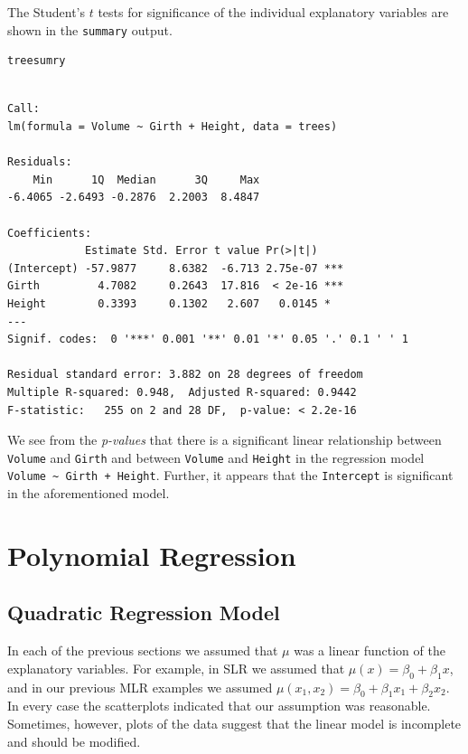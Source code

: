 \documentclass[captions=tableheading]{scrbook}
\begin{document}
The Student's \(t\) tests for significance of the individual explanatory variables are shown in the \texttt{summary} output.


\begin{verbatim}
treesumry
\end{verbatim}


\begin{verbatim}

Call:
lm(formula = Volume ~ Girth + Height, data = trees)

Residuals:
    Min      1Q  Median      3Q     Max 
-6.4065 -2.6493 -0.2876  2.2003  8.4847 

Coefficients:
            Estimate Std. Error t value Pr(>|t|)    
(Intercept) -57.9877     8.6382  -6.713 2.75e-07 ***
Girth         4.7082     0.2643  17.816  < 2e-16 ***
Height        0.3393     0.1302   2.607   0.0145 *  
---
Signif. codes:  0 '***' 0.001 '**' 0.01 '*' 0.05 '.' 0.1 ' ' 1 

Residual standard error: 3.882 on 28 degrees of freedom
Multiple R-squared: 0.948,	Adjusted R-squared: 0.9442 
F-statistic:   255 on 2 and 28 DF,  p-value: < 2.2e-16
\end{verbatim}

We see from the \emph{p-values} that there is a significant linear relationship between \texttt{Volume} and \texttt{Girth} and between \texttt{Volume} and \texttt{Height} in the regression model \texttt{Volume \textasciitilde{} Girth + Height}. Further, it appears that the \texttt{Intercept} is significant in the aforementioned model.
\section{Polynomial Regression}
\label{sec-12-4}
\label{sec-Polynomial-Regression}
\subsection{Quadratic Regression Model}
\label{sec-12-4-1}


In each of the previous sections we assumed that \(\mu\) was a linear function of the explanatory variables. For example, in SLR we assumed that \(\mu(x)=\beta_{0}+\beta_{1}x\), and in our previous MLR examples we assumed \(\mu(x_{1},x_{2})=\beta_{0}+\beta_{1}x_{1}+\beta_{2}x_{2}\). In every case the scatterplots indicated that our assumption was reasonable. Sometimes, however, plots of the data suggest that the linear model is incomplete and should be modified.
\end{document}

